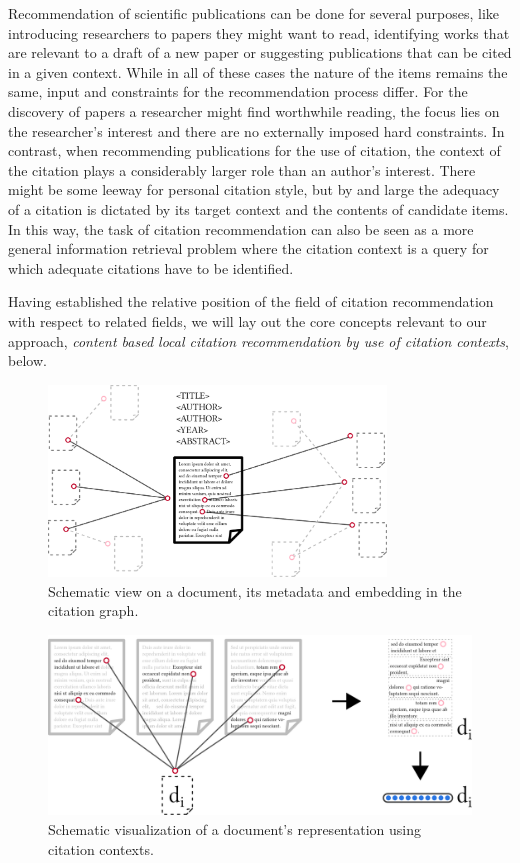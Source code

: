 Recommendation of scientific publications can be done for several purposes, like introducing researchers to papers they might want to read, identifying works that are relevant to a draft of a new paper or suggesting publications that can be cited in a given context. While in all of these cases the nature of the items remains the same, input and constraints for the recommendation process differ. For the discovery of papers a researcher might find worthwhile reading, the focus lies on the researcher's interest and there are no externally imposed hard constraints. In contrast, when recommending publications for the use of citation, the context of the citation plays a considerably larger role than an author's interest. There might be some leeway for personal citation style, but by and large the adequacy of a citation is dictated by its target context and the contents of candidate items. In this way, the task of citation recommendation can also be seen as a more general information retrieval problem where the citation context is a query for which adequate citations have to be identified.

Having established the relative position of the field of citation recommendation with respect to related fields, we will lay out the core concepts relevant to our approach, \emph{content based local citation recommendation by use of citation contexts}, below.

\begin{figure}
  \centering
    \includegraphics[width=0.8\textwidth]{figures/background/document_rich_view.pdf}
  \caption{Schematic view on a document, its metadata and embedding in the citation graph.}
  \label{fig:docrichview}
\end{figure}

\begin{figure}[t]
  \centering
    \includegraphics[width=\textwidth]{figures/background/document_context_view_withvec.pdf}
  \caption{Schematic visualization of a document's representation using citation contexts.}
  \label{fig:doccontview}
\end{figure}

